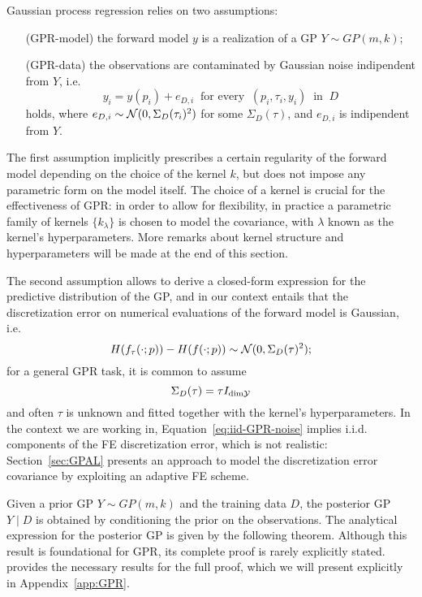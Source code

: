 Gaussian process regression relies on two assumptions:
\begin{itemize}[font=\itshape, leftmargin=1.5cm, align=right, labelwidth=2.4cm]
    \item[(GPR-model)] the forward model $y$ is a realization of a GP $Y \sim GP(m, k)$;
    \item[(GPR-data)] the observations are contaminated by Gaussian noise indipendent from $Y$, i.e. 
    \[ 
        y_i = y(p_i) + e_{D,i} \ \text{ for every } \ (p_i,\tau_i,y_i) \ \text{ in } \ D 
    \] 
    holds, where $e_{D,i} \sim \mathcal N(0, \Sigma_D(\tau_i)^2)$ for some $\Sigma_D(\tau)$, and $e_{D,i}$ is indipendent from $Y$.
\end{itemize}  
The first assumption implicitly prescribes a certain regularity of the forward model depending on the choice of the kernel $k$, but does not impose any parametric form on the model itself. 
The choice of a kernel is crucial for the effectiveness of GPR: in order to allow for flexibility, in practice a parametric family of kernels $\{ k_\lambda\}$ is chosen to model the covariance, with $\lambda$ known as the kernel's hyperparameters. More remarks about kernel structure and hyperparameters will be made at the end of this section.

The second assumption allows to derive a closed-form expression for the predictive distribution of the GP, and in our context entails that the discretization error on numerical evaluations of the forward model is Gaussian, i.e. 
\[
    H(f_{\tau}(\cdot; p)) - H(f(\cdot; p)) \sim \mathcal N(0, \Sigma_D(\tau)^2);
\] for a general GPR task, it is common to assume 
\begin{equation}\label{eq:iid-GPR-noise}
    \Sigma_D(\tau) = \tau I_{\text{dim} \mathcal Y}
\end{equation} 
and often $\tau$ is unknown and fitted together with the kernel's hyperparameters. \newline
In the context we are working in, Equation~\eqref{eq:iid-GPR-noise} implies i.i.d. components of the FE discretization error, which is not realistic: Section~\ref{sec:GPAL} presents an approach to model the discretization error covariance by exploiting an adaptive FE scheme. \newline

Given a prior GP $Y \sim GP(m, k)$ and the training data $D$, the posterior GP $Y \mid D$ is obtained by conditioning the prior on the observations. 
The analytical expression for the posterior GP is given by the following theorem.
Although this result is foundational for GPR, its complete proof is rarely explicitly stated.~\cite[Appendix A]{RasmussenWilliams2006} provides the necessary results for the full proof, which we will present explicitly in Appendix~\ref{app:GPR}.

